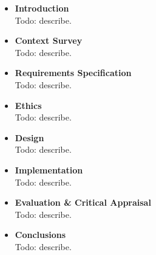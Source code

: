 \begin{itemize}
    \item \textbf{Introduction}\\
    Todo: describe.
    \item \textbf{Context Survey}\\
    Todo: describe.
    \item \textbf{Requirements Specification}\\
    Todo: describe.
    \item \textbf{Ethics}\\
    Todo: describe.
    \item \textbf{Design}\\
    Todo: describe.
    \item \textbf{Implementation}\\
    Todo: describe.
    \item \textbf{Evaluation \& Critical Appraisal}\\
    Todo: describe.
    \item \textbf{Conclusions}\\
    Todo: describe.
\end{itemize}